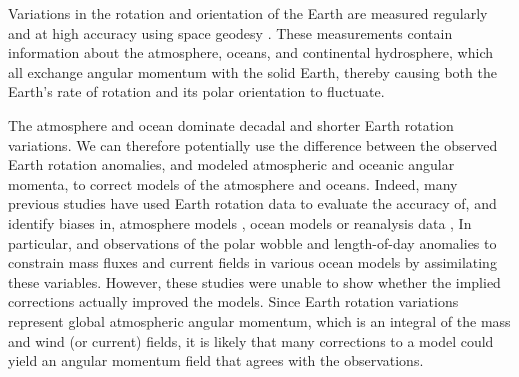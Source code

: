 
Variations in the rotation and orientation of the Earth are measured regularly and at high accuracy using space geodesy \citep{Gross1992,iers}. 
These measurements contain information about the atmosphere, oceans, and continental hydrosphere, which all exchange angular momentum with the solid Earth, thereby causing both the Earth's rate of rotation and its polar orientation to fluctuate. 

The atmosphere and ocean dominate decadal and shorter Earth rotation variations. 
We can therefore potentially use the difference between the observed Earth rotation anomalies, and modeled atmospheric and oceanic angular momenta, to correct models of the atmosphere and oceans. 
Indeed, many previous studies have used Earth rotation data to evaluate the accuracy of, 
and identify biases in, atmosphere models \citep{Boer1990, Rosen2000}, ocean 
models \citep{Gross1996a} or reanalysis data \citep{Yu1999, Aoyama2000, 
Paek2012a},
In particular, \citet{Saynisch2010,Saynisch2011} and \citet{Saynisch2012} observations of the polar wobble and length-of-day anomalies to constrain mass fluxes and current fields in various ocean models by assimilating these variables.
However, these studies were unable to show whether the implied corrections actually improved the models. 
Since Earth rotation variations represent global atmospheric angular momentum, which is an integral of the mass and wind (or current) fields, it is likely that many corrections to a model could yield an angular momentum field that agrees with the observations. 

